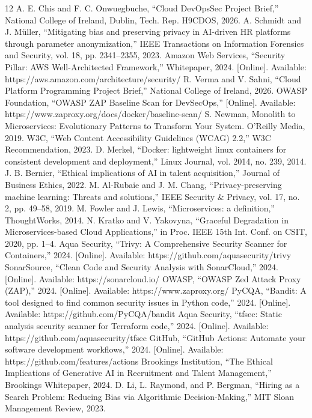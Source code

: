 \documentclass[conference]{IEEEtran}
\begin{document}
\begin{thebibliography}{12}
 A. E. Chis and F. C. Onwuegbuche, ``Cloud DevOpsSec Project Brief,'' National College of Ireland, Dublin, Tech. Rep. H9CDOS, 2026.
 A. Schmidt and J. Müller, ``Mitigating bias and preserving privacy in AI-driven HR platforms through parameter anonymization,'' IEEE Transactions on Information Forensics and Security, vol. 18, pp. 2341--2355, 2023.
 Amazon Web Services, ``Security Pillar: AWS Well-Architected Framework,'' Whitepaper, 2024. [Online]. Available: https://aws.amazon.com/architecture/security/
 R. Verma and V. Sahni, ``Cloud Platform Programming Project Brief,'' National College of Ireland, 2026.
 OWASP Foundation, ``OWASP ZAP Baseline Scan for DevSecOps,'' [Online]. Available: https://www.zaproxy.org/docs/docker/baseline-scan/
 S. Newman, Monolith to Microservices: Evolutionary Patterns to Transform Your System. O'Reilly Media, 2019. 
 W3C, ``Web Content Accessibility Guidelines (WCAG) 2.2,'' W3C Recommendation, 2023.
 D. Merkel, ``Docker: lightweight linux containers for consistent development and deployment,'' Linux Journal, vol. 2014, no. 239, 2014.
 J. B. Bernier, ``Ethical implications of AI in talent acquisition,'' Journal of Business Ethics, 2022.
 M. Al-Rubaie and J. M. Chang, ``Privacy-preserving machine learning: Threats and solutions,'' IEEE Security \& Privacy, vol. 17, no. 2, pp. 49--58, 2019.
 M. Fowler and J. Lewis, ``Microservices: a definition,'' ThoughtWorks, 2014.
 N. Kratko and V. Yakovyna, ``Graceful Degradation in Microservices-based Cloud Applications,'' in Proc. IEEE 15th Int. Conf. on CSIT, 2020, pp. 1--4.
 Aqua Security, ``Trivy: A Comprehensive Security Scanner for Containers,'' 2024. [Online]. Available: https://github.com/aquasecurity/trivy
 SonarSource, ``Clean Code and Security Analysis with SonarCloud,'' 2024. [Online]. Available: https://sonarcloud.io/
 OWASP, ``OWASP Zed Attack Proxy (ZAP),'' 2024. [Online]. Available: https://www.zaproxy.org/
 PyCQA, ``Bandit: A tool designed to find common security issues in Python code,'' 2024. [Online]. Available: https://github.com/PyCQA/bandit
 Aqua Security, ``tfsec: Static analysis security scanner for Terraform code,'' 2024. [Online]. Available: https://github.com/aquasecurity/tfsec
 GitHub, ``GitHub Actions: Automate your software development workflows,'' 2024. [Online]. Available: https://github.com/features/actions
 Brookings Institution, ``The Ethical Implications of Generative AI in Recruitment and Talent Management,'' Brookings Whitepaper, 2024. 
 D. Li, L. Raymond, and P. Bergman, ``Hiring as a Search Problem: Reducing Bias via Algorithmic Decision-Making,'' MIT Sloan Management Review, 2023.
\end{thebibliography}
\end{document}
